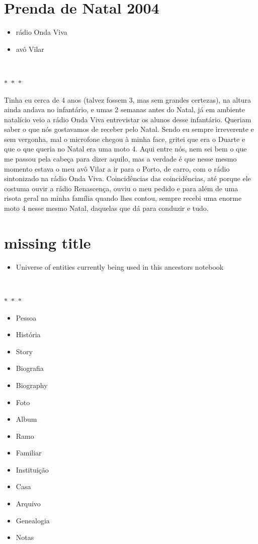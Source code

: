 \documentclass{article}
\begin{document}
\section{Prenda de Natal 2004}
\begin{itemize}\item rádio Onda Viva
\item avô Vilar
\end{itemize}
\  
    \begin{center}
        $\ast$~$\ast$~$\ast$
    \end{center}
    Tinha eu cerca de 4 anos (talvez fossem 3, mas sem grandes certezas), na
altura ainda andava no infantário, e umas 2 semanas antes do Natal, já
em ambiente natalício veio a rádio Onda Viva entrevistar os alunos desse
infantário. Queriam saber o que nós gostavamos de receber pelo Natal.
Sendo eu sempre irreverente e sem vergonha, mal o microfone chegou à
minha face, gritei que era o Duarte e que o que queria no Natal era uma
moto 4. Aqui entre nós, nem sei bem o que me passou pela cabeça para
dizer aquilo, mas a verdade é que nesse mesmo momento estava o meu avô
Vilar a ir para o Porto, de carro, com o rádio sintonizado na rádio Onda
Viva. Coincidências das coincidências, até porque ele costuma ouvir a
rádio Renascença, ouviu o meu pedido e para além de uma risota geral na
minha família quando lhes contou, sempre recebi uma enorme moto 4 nesse
mesmo Natal, daquelas que dá para conduzir e tudo.

    	
\pagebreak\section{missing title}
\begin{itemize}\item Universe of entities currently being used in this ancestors notebook
\end{itemize}
\  
    \begin{center}
        $\ast$~$\ast$~$\ast$
    \end{center}
    \begin{itemize}
\tightlist
\item
  Pessoa
\item
  História
\item
  Story
\item
  Biografia
\item
  Biography
\item
  Foto
\item
  Album
\item
  Ramo
\item
  Familiar
\item
  Instituição
\item
  Casa
\item
  Arquivo
\item
  Genealogia
\item
  Notas
\end{itemize}
\end{document}
